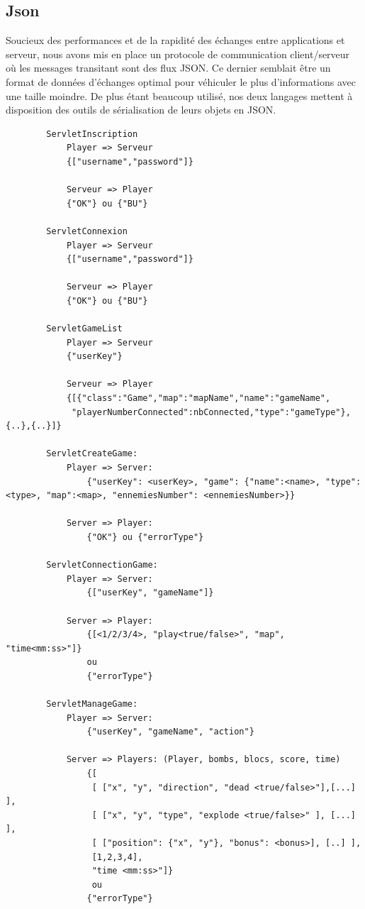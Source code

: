 \documentclass[a4paper,11pt]{report}
\begin{document}
		\subsection{Json}
		Soucieux des performances et de la rapidité des échanges entre applications et
		serveur, nous avons mis en place un protocole de communication client/serveur
		où les messages transitant sont des flux JSON. Ce dernier semblait être un
		format de données d'échanges optimal pour véhiculer le plus d'informations
		avec une taille moindre. De plus étant beaucoup utilisé, nos deux langages
		mettent à disposition des outils de sérialisation de leurs objets en JSON.
		
		\begin{verbatim}
		ServletInscription
			Player => Serveur
			{["username","password"]}
			
			Serveur => Player
			{"OK"} ou {"BU"}
			
		ServletConnexion 	
			Player => Serveur
			{["username","password"]}
			
			Serveur => Player
			{"OK"} ou {"BU"}
			
		ServletGameList
			Player => Serveur
			{"userKey"}
		
			Serveur => Player
			{[{"class":"Game","map":"mapName","name":"gameName",
			 "playerNumberConnected":nbConnected,"type":"gameType"},{..},{..}]}
			 
		ServletCreateGame:
			Player => Server:
				{"userKey": <userKey>, "game": {"name":<name>, "type":<type>, "map":<map>, "ennemiesNumber": <ennemiesNumber>}}
				
			Server => Player:
				{"OK"} ou {"errorType"}
			 
		ServletConnectionGame:
			Player => Server:
				{["userKey", "gameName"]}
				
			Server => Player:
				{[<1/2/3/4>, "play<true/false>", "map", "time<mm:ss>"]} 
				ou 
				{"errorType"}
				
		ServletManageGame:
			Player => Server: 
				{"userKey", "gameName", "action"}	
				
			Server => Players: (Player, bombs, blocs, score, time)
				{[
				 [ ["x", "y", "direction", "dead <true/false>"],[...] ],
				 [ ["x", "y", "type", "explode <true/false>" ], [...] ],
				 [ ["position": {"x", "y"}, "bonus": <bonus>], [..] ],
				 [1,2,3,4],
				 "time <mm:ss>"]} 
				 ou 
				{"errorType"}
			 
			 
		\end{verbatim}
		
\end{document}
